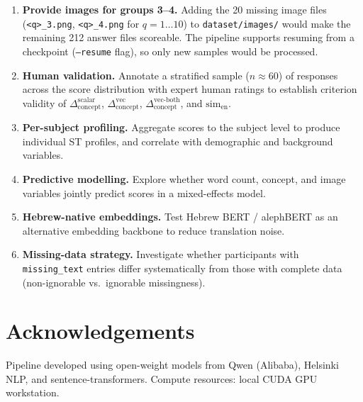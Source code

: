 \documentclass[12pt,a4paper]{article}
\newcommand{\simEN}{\ensuremath{\mathrm{sim}_{\text{en}}}}
\newcommand{\SACs}{\ensuremath{\Delta_{\text{concept}}^{\text{scalar}}}}
\newcommand{\SACv}{\ensuremath{\Delta_{\text{concept}}^{\text{vec}}}}
\newcommand{\SACvb}{\ensuremath{\Delta_{\text{concept}}^{\text{vec-both}}}}
\begin{document}
\begin{enumerate}
  \item \textbf{Provide images for groups 3--4.} Adding the 20 missing image files
        (\texttt{<q>\_3.png}, \texttt{<q>\_4.png} for $q=1\ldots10$) to
        \texttt{dataset/images/} would make the remaining 212 answer files scoreable.
        The pipeline supports resuming from a checkpoint
        (\texttt{--resume} flag), so only new samples would be processed.
  \item \textbf{Human validation.} Annotate a stratified sample ($n \approx 60$) of
        responses across the score distribution with expert human ratings to establish
      criterion validity of \SACs{}, \SACv{}, \SACvb{}, and \simEN{}.
  \item \textbf{Per-subject profiling.} Aggregate scores to the subject level to
        produce individual ST profiles, and correlate with demographic and
        background variables.
  \item \textbf{Predictive modelling.} Explore whether word count, concept, and
        image variables jointly predict scores in a mixed-effects model.
  \item \textbf{Hebrew-native embeddings.} Test Hebrew BERT / alephBERT as an
        alternative embedding backbone to reduce translation noise.
  \item \textbf{Missing-data strategy.} Investigate whether participants with
        \texttt{missing\_text} entries differ systematically from those with complete
        data (non-ignorable vs.\ ignorable missingness).
\end{enumerate}

\section*{Acknowledgements}

Pipeline developed using open-weight models from Qwen (Alibaba), Helsinki NLP,
and sentence-transformers.  Compute resources: local CUDA GPU workstation.
\end{document}
